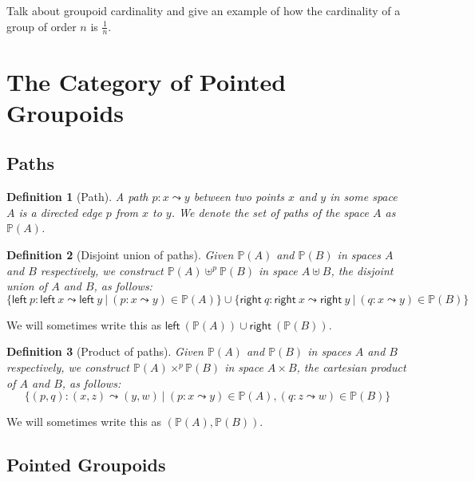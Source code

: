 \documentclass[11pt]{article}
\newtheorem{definition}{Definition}
\newcommand{\union}{\cup}
\renewcommand{\path}{\leadsto}
\newcommand{\paths}[1]{\mathds{P}(#1)}
\newcommand{\leftv}[1]{\textsf{left}~#1}
\newcommand{\rightv}[1]{\textsf{right}~#1}
\begin{document}
Talk about groupoid cardinality and give an example of how the cardinality of
a group of order $n$ is $\frac{1}{n}$.

\section{The Category of Pointed Groupoids}

\subsection{Paths} 

\begin{definition}[Path]
A \emph{path} $p : x \path y$ between two points $x$ and $y$ in some space
$A$ is a directed edge $p$ from $x$ to $y$. We denote the set of paths of the
space $A$ as $\paths{A}$.
\end{definition}

\begin{definition}[Disjoint union of paths]
Given $\paths{A}$ and $\paths{B}$ in spaces $A$ and $B$ respectively, we
construct $\paths{A} \uplus^p \paths{B}$ in space $A \uplus B$, the disjoint
union of $A$ and $B$, as follows:
\[ 
  \{ \leftv{p} : \leftv{x} \path \leftv{y} ~|~ 
    (p : x \path y) \in \paths{A} \}
  \union
  \{ \rightv{q} : \rightv{x} \path \rightv{y} ~|~ 
    (q : x \path y) \in \paths{B} \}
\]
\end{definition}
We will sometimes write this as $\leftv{(\paths{A})} \union
\rightv{(\paths{B})}$.

\begin{definition}[Product of paths]
Given $\paths{A}$ and $\paths{B}$ in spaces $A$ and $B$
respectively, we construct $\paths{A} \times^p \paths{B}$ in
space $A \times B$, the cartesian product of $A$ and $B$, as follows: 
\[ 
\{ (p,q) : (x,z) \path (y,w) ~|~ (p : x \path y) \in \paths{A}, 
   (q : z \path w) \in \paths{B} \}
\]
\end{definition}
We will sometimes write this as $(\paths{A},\paths{B})$.

\subsection{Pointed Groupoids} 
\end{document}
